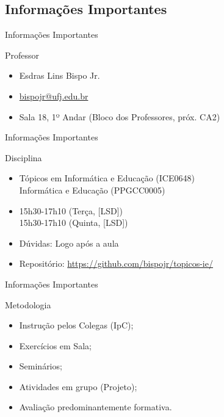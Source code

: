 \documentclass[xcolor=dvipsnames,table]{beamer}
\begin{document}
	\subsection{Informações Importantes}
	\begin{frame}{Informações Importantes}
		\begin{block}{Professor}
			\begin{itemize}
				\item Esdras Lins Bispo Jr.
				\item \url{bispojr@ufj.edu.br}
				\item Sala 18, 1º Andar (Bloco dos Professores, próx. CA2)
			\end{itemize}
		\end{block}
	\end{frame}	
	
	\begin{frame}{Informações Importantes}
		\begin{block}{Disciplina}
			\begin{itemize}
				\item Tópicos em Informática e Educação (ICE0648) \\
				Informática e Educação (PPGCC0005)
				\item 15h30-17h10 (Terça, [LSD])\\
				 15h30-17h10 (Quinta, [LSD])
				\item Dúvidas: Logo após a aula\color{red}{*}
				\item Repositório: \url{https://github.com/bispojr/topicos-ie/}
			\end{itemize}
		\end{block}
	\end{frame}	
	
\begin{frame}{Informações Importantes}
    \begin{block}{Metodologia}
        \begin{itemize}
            \item Instrução pelos Colegas (IpC);
            \item Exercícios em Sala;
            \item Seminários;
            \item Atividades em grupo (Projeto);
            \item Avaliação predominantemente formativa.
        \end{itemize}
    \end{block}
\end{frame}
\end{document}
